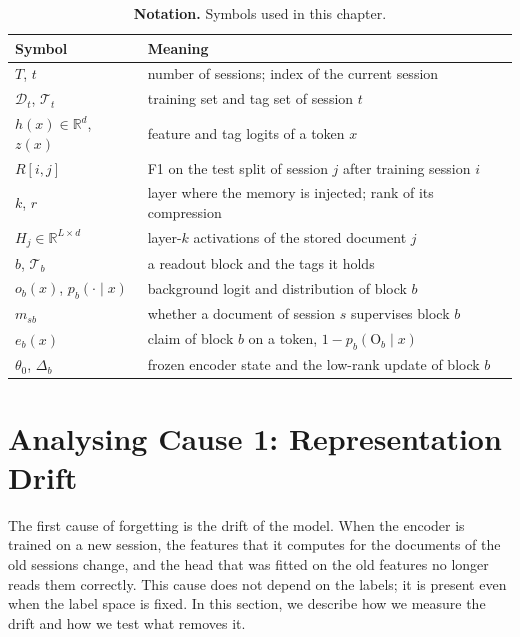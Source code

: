 \begin{table}[!htbp]
  \centering
  \caption[Notation of the methodology]{\textbf{Notation.} Symbols used in this chapter.}
  \label{tab:notation}
  \begin{tabular}{@{}ll@{}}
    \toprule
    Symbol & Meaning \\
    \midrule
    $T$, $t$ & number of sessions; index of the current session \\
    $\mathcal{D}_t$, $\mathcal{T}_t$ & training set and tag set of session $t$ \\
    $h(x)\in\mathbb{R}^{d}$, $z(x)$ & feature and tag logits of a token $x$ \\
    $R[i,j]$ & F1 on the test split of session $j$ after training session $i$ \\
    $k$, $r$ & layer where the memory is injected; rank of its compression \\
    $H_j\in\mathbb{R}^{L\times d}$ & layer-$k$ activations of the stored document $j$ \\
    $b$, $\mathcal{T}_b$ & a readout block and the tags it holds \\
    $o_b(x)$, $p_b(\cdot\mid x)$ & background logit and distribution of block $b$ \\
    $m_{sb}$ & whether a document of session $s$ supervises block $b$ \\
    $e_b(x)$ & claim of block $b$ on a token, $1-p_b(\mathrm{O}_b\mid x)$ \\
    $\theta_0$, $\Delta_b$ & frozen encoder state and the low-rank update of block $b$ \\
    \bottomrule
  \end{tabular}
\end{table}

\section{Analysing Cause 1: Representation Drift}
\label{sec:m-drift}

The first cause of forgetting is the drift of the model. When the encoder is trained on a
new session, the features that it computes for the documents of the old sessions change, and
the head that was fitted on the old features no longer reads them correctly. This cause does
not depend on the labels; it is present even when the label space is fixed. In this section,
we describe how we measure the drift and how we test what removes it.

